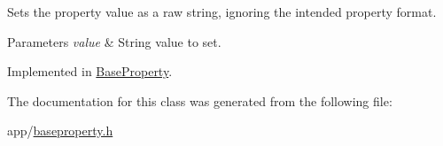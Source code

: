 Sets the property value as a raw string, ignoring the intended property format. 


\begin{DoxyParams}{Parameters}
{\em value} & String value to set. \\
\hline
\end{DoxyParams}


Implemented in \hyperlink{class_base_property_adf0d7a0e824a9d058387336d91514539}{Base\-Property}.



The documentation for this class was generated from the following file\-:\begin{DoxyCompactItemize}
\item 
app/\hyperlink{baseproperty_8h}{baseproperty.\-h}\end{DoxyCompactItemize}
